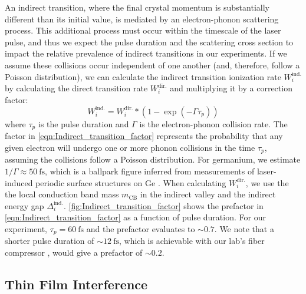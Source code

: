 An indirect transition, where the final crystal momentum is substantially different than its initial value, is mediated by an electron-phonon scattering process. This additional process must occur within the timescale of the laser pulse, and thus we expect the pulse duration and the scattering cross section to impact the relative prevalence of indirect transitions in our experiments. If we assume these collisions occur independent of one another (and, therefore, follow a Poisson distribution), we can calculate the indirect transition ionization rate $W_i^{\textrm{ind.}}$ by calculating the direct transition rate $W_i^{\textrm{dir.}}$ and multiplying it by a correction factor:
\begin{equation}
W_i^{\textrm{ind.}} = W_i^{\textrm{dir.}} * (1 - \exp(-\Gamma \tau_p))
\label{eqn:Indirect_transition_factor}
\end{equation}
where $\tau_p$ is the pulse duration and $\Gamma$ is the electron-phonon collision rate. The factor in \cref{eqn:Indirect_transition_factor} represents the probability that any given electron will undergo one or more phonon collisions in the time $\tau_p$, assuming the collisions follow a Poisson distribution. For germanium, we estimate $1/\Gamma \approx 50 \ \textrm{fs}$, which is a ballpark figure inferred from measurements of laser-induced periodic surface structures on Ge \cite{austinSemiconductorSurfaceModification2017}. When calculating $W_i^{\textrm{dir.}}$, we use the the local conduction band mass $m_{\textrm{CB}}$ in the indirect valley and the indirect energy gap $\Delta_i^{\textrm{ind.}}$. \cref{fig:Indirect_transition_factor} shows the prefactor in \cref{eqn:Indirect_transition_factor} as a function of pulse duration. For our experiment, $\tau_p = 60 \ \textrm{fs}$ and the prefactor evaluates to $\sim 0.7$. We note that a shorter pulse duration of $\sim 12 \ \textrm{fs}$, which is achievable with our lab's fiber compressor \cite{zhangAtomicMolecularDynamics2015}, would give a prefactor of $\sim 0.2$.

\subsection{Thin Film Interference}

